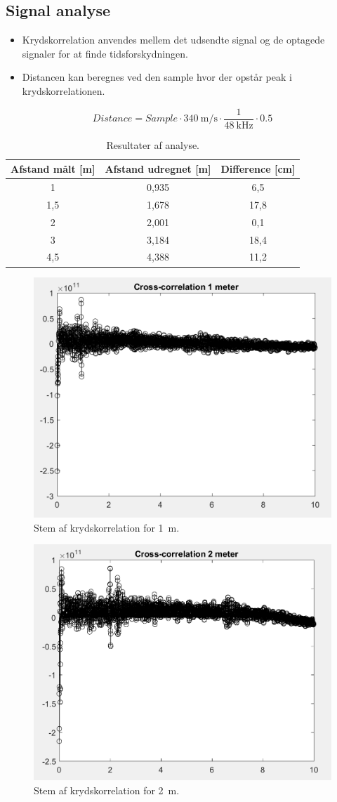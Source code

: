 \documentclass[danish]{article}
\begin{document}
\subsection{Signal analyse}
\begin{itemize}
	\item Krydskorrelation anvendes mellem det udsendte signal og de optagede signaler for at finde tidsforskydningen.
	\item Distancen kan beregnes ved den sample hvor der opstår peak i krydskorrelationen.
\end{itemize}

\begin{equation}
Distance = Sample\cdot \SI{340}{\meter\per\second} \cdot \frac{1}{\SI{48}{\kilo\hertz}} \cdot 0.5
\end{equation}
\begin{table} [H]
	\centering
\begin{tabular}{|c|c|c|}
	\hline 
	Afstand målt [m] & Afstand udregnet [m] & Difference [cm] \\ 
	\hline 
	1 & 0,935 & 6,5 \\ 
	\hline 
	1,5 & 1,678 & 17,8 \\ 
	\hline 
	2 & 2,001 & 0,1 \\ 
	\hline 
	3 & 3,184 & 18,4 \\ 
	\hline 
	4,5 & 4,388 & 11,2 \\ 
	\hline 
\end{tabular} 
\caption{Resultater af analyse.}
\end{table}

\begin{figure}[H]
	\centering
	\includegraphics[width=0.54\linewidth]{graphics/case4_opg4_1}
	\caption{Stem af krydskorrelation for \SI{1}{\meter}.}
	\label{fig:case4_opg4_1}
\end{figure}

\begin{figure}[H]
	\centering
	\includegraphics[width=0.54\linewidth]{graphics/case4_opg4_2}
	\caption{Stem af krydskorrelation for \SI{2}{\meter}.}
	\label{fig:case4_opg4_2}
\end{figure}
\end{document}

